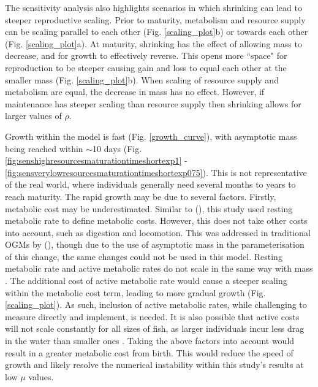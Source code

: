 \documentclass[a4paper, 11pt, hidelinks]{article} %
\begin{document}
	The sensitivity analysis also highlights scenarios in which shrinking can lead to steeper reproductive scaling.  Prior to maturity, metabolism and resource supply can be scaling parallel to each other (Fig. \ref{scaling_plot}b) or towards each other (Fig. \ref{scaling_plot}a).  At maturity, shrinking has the effect of allowing mass to decrease, and for growth to effectively reverse.  This opens more ``space" for reproduction to be steeper causing gain and loss to equal each other at the smaller mass (Fig. \ref{scaling_plot}b).  When scaling of resource supply and metabolism are equal, the decrease in mass has no effect. However, if maintenance has steeper scaling than resource supply then shrinking allows for larger values of $ \rho $.
	

	Growth within the model is fast (Fig. \ref{growth_curve}), with asymptotic mass being reached within $\sim$10 days (Fig. \ref{fig:senshighresourcesmaturationtimeshortexp1} - \ref{fig:sensverylowresourcesmaturationtimeshortexp075}).
	This is not representative of the real world, where individuals generally need several months to years to reach maturity.	
	The rapid growth may be due to several factors.  Firstly, metabolic cost may be underestimated.  Similar to \citeauthor{West2001} (\citeyear{West2001}), this study used resting metabolic rate to define metabolic costs.  However, this does not take other costs into account, such as digestion and locomotion.
	This was addressed in traditional OGMs by \citeauthor{Hou2008} (\citeyear{Hou2008}), though due to the use of asymptotic mass in the parameterisation of this change, the same changes could not be used in this model.  Resting metabolic rate and active metabolic rates do not scale in the same way with mass \parencite{Gillooly2001, Weibel2004}.  The additional cost of active metabolic rate would cause a steeper scaling within the metabolic cost term, leading to more gradual growth (Fig. \ref{scaling_plot}). 
	As such, inclusion of active metabolic rates, while challenging to measure directly and implement, is needed.  It is also possible that active costs will not scale constantly for all sizes of fish, as larger individuals incur less drag in the water than smaller ones \parencite{Muller2000}.  Taking the above factors into account would result in a greater metabolic cost from birth.  This would reduce the speed of growth and likely resolve the numerical instability within this study's results at low $ \mu $ values.
	
\end{document}

